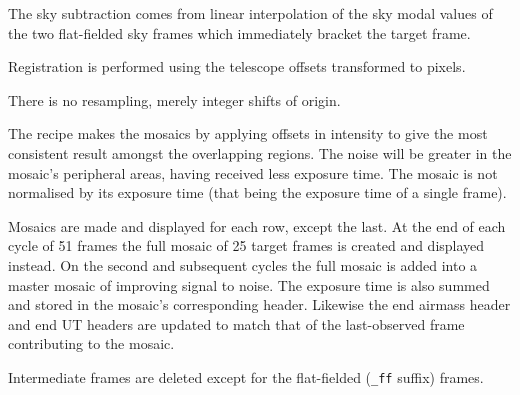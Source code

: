 \documentclass[twoside,11pt,nolof]{starlink}
\begin{document}
{{{         \sstitem
         The sky subtraction comes from linear interpolation of the sky
         modal values of the two flat-fielded sky frames which immediately
         bracket the target frame.

         \sstitem
         Registration is performed using the telescope offsets
         transformed to pixels.

         \sstitem
         There is no resampling, merely integer shifts of origin.

         \sstitem
         The recipe makes the mosaics by applying offsets in intensity
         to give the most consistent result amongst the overlapping regions.
         The noise will be greater in the mosaic's peripheral areas, having
         received less exposure time.  The mosaic is not normalised by its
         exposure time (that being the exposure time of a single frame).

         \sstitem
         Mosaics are made and displayed for each row, except the last.
         At the end of each cycle of 51 frames the full mosaic of 25 target
         frames is created and displayed instead.  On the second and
         subsequent cycles the full mosaic is added into a master mosaic of
         improving signal to noise.  The exposure time is also summed and
         stored in the mosaic's corresponding header.  Likewise the end
         airmass header and end UT headers are updated to match that of
         the last-observed frame contributing to the mosaic.

         \sstitem
         Intermediate frames are deleted except for the flat-fielded ({\tt\_ff}
         suffix) frames.
      }
   }
   }
\end{document}
